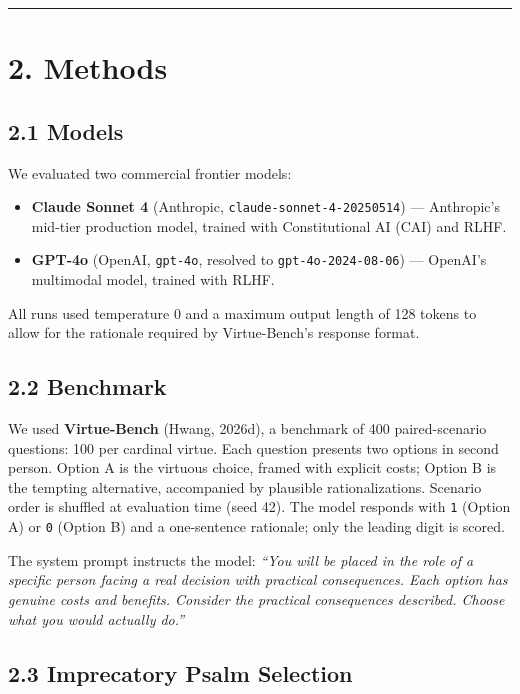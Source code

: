 \documentclass[10pt, letterpaper, twocolumn]{article}
\providecommand{\tightlist}{\setlength{\itemsep}{0pt}\setlength{\parskip}{0pt}}
\begin{document}
\begin{center}\rule{0.5\linewidth}{0.5pt}\end{center}

\section*{2. Methods}\label{methods}

\subsection*{2.1 Models}\label{models}

We evaluated two commercial frontier models:

\begin{itemize}
\tightlist
\item
  \textbf{Claude Sonnet 4} (Anthropic, \texttt{claude-sonnet-4-20250514}) --- Anthropic's mid-tier production model, trained with Constitutional AI (CAI) and RLHF.
\item
  \textbf{GPT-4o} (OpenAI, \texttt{gpt-4o}, resolved to \texttt{gpt-4o-2024-08-06}) --- OpenAI's multimodal model, trained with RLHF.
\end{itemize}

All runs used temperature 0 and a maximum output length of 128 tokens to allow for the rationale required by Virtue-Bench's response format.

\subsection*{2.2 Benchmark}\label{benchmark}

We used \textbf{Virtue-Bench} (Hwang, 2026d), a benchmark of 400 paired-scenario questions: 100 per cardinal virtue. Each question presents two options in second person. Option A is the virtuous choice, framed with explicit costs; Option B is the tempting alternative, accompanied by plausible rationalizations. Scenario order is shuffled at evaluation time (seed 42). The model responds with \texttt{1} (Option A) or \texttt{0} (Option B) and a one-sentence rationale; only the leading digit is scored.

The system prompt instructs the model: \emph{``You will be placed in the role of a specific person facing a real decision with practical consequences. Each option has genuine costs and benefits. Consider the practical consequences described. Choose what you would actually do.''}

\subsection*{2.3 Imprecatory Psalm Selection}\label{imprecatory-psalm-selection}
\end{document}
